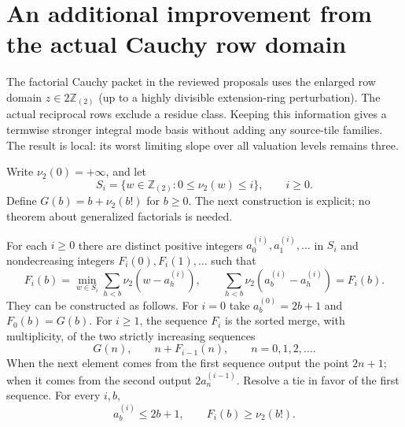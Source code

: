 \section{An additional improvement from the actual Cauchy row domain}
\label{sec:annulus-modes}

The factorial Cauchy packet in the reviewed proposals uses the enlarged
row domain $z\in2\mathbb Z_{(2)}$ (up to a highly divisible extension-ring
perturbation). The actual reciprocal rows exclude a residue class.
Keeping this information gives a termwise stronger integral mode basis
without adding any source-tile families. The result is local: its worst
limiting slope over all valuation levels remains three.

Write $\nu_2(0)=+\infty$, and let
\[
 S_i=\{w\in\mathbb Z_{(2)}:0\le\nu_2(w)\le i\},\qquad i\ge0.
\]
Define $G(b)=b+\nu_2(b!)$ for $b\ge0$. The next construction is explicit;
no theorem about generalized factorials is needed.

\begin{lemma}
\label{lem:annulus-order}
For each $i\ge0$ there are distinct positive integers
$a^{(i)}_0,a^{(i)}_1,\ldots$ in $S_i$ and nondecreasing integers
$F_i(0),F_i(1),\ldots$ such that
\[
 F_i(b)=\min_{w\in S_i}\sum_{h<b}\nu_2(w-a^{(i)}_h),
 \qquad
 \sum_{h<b}\nu_2(a^{(i)}_b-a^{(i)}_h)=F_i(b).
\]
They can be constructed as follows. For $i=0$ take
$a^{(0)}_b=2b+1$ and $F_0(b)=G(b)$. For $i\ge1$, the sequence
$F_i$ is the sorted merge, with multiplicity, of the two strictly
increasing sequences
\[
 G(n),\qquad n+F_{i-1}(n),\qquad n=0,1,2,\ldots.
\]
When the next element comes from the first sequence output the point
$2n+1$; when it comes from the second output $2a^{(i-1)}_n$.
Resolve a tie in favor of the first sequence. For every $i,b$,
\[
 a^{(i)}_b\le2b+1,
 \qquad F_i(b)\ge\nu_2(b!).
\]
\end{lemma}

